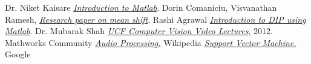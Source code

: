 \documentclass[a4paper,12pt,oneside]{book}
\begin{document}
\begin{thebibliography}{li}
Dr. Niket Kaisare
{\em \href{https://www.youtube.com/watch?v=pj4KKLUMIAg&list=PLa8a_8vztYc7aK6H4bpQTbOqelVIND9Aw}{Introduction to Matlab}}.
Dorin Comaniciu, Visvanathan Ramesh,
{\em \href{http://comaniciu.net/Papers/MsTracking.pdf}{Research paper on mean shift}}.
 Rashi Agrawal
{\em \href{https://www.youtube.com/watch?v=-cSVGwAwZZ4&list=PLEo-jHOqGNyUWoCSD3l3V-FjX9PnHvx5n}{Introduction to DIP using Matlab}}.
 Dr. Mubarak Shah
{\em \href{https://www.youtube.com/watch?v=M8B3RZVqgOo}{UCF Computer Vision Video Lectures}},
2012.
Mathworks Community
{\em \href{http://in.mathworks.com/help/signal/examples/practical-introduction-to-frequency-domain-analysis.html}{Audio Processing.}}
Wikipedia
{\em \href{https://en.wikipedia.org/wiki/Support_vector_machine}{Support Vector Machine.}}
Google
\end{thebibliography}
\end{document}
